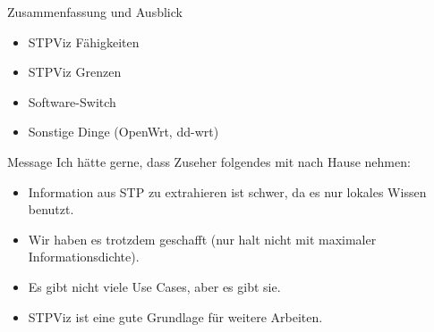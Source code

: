 \documentclass{beamer}
\begin{document}
\begin{frame}{Zusammenfassung und Ausblick}
    \begin{itemize}
        \item STPViz Fähigkeiten
        \item STPViz Grenzen
        \item Software-Switch
        \item Sonstige Dinge (OpenWrt, dd-wrt)
    \end{itemize}
\end{frame}

\begin{frame}{Message}
Ich hätte gerne, dass Zuseher folgendes mit nach Hause nehmen:\\
\begin{itemize}
    \item Information aus STP zu extrahieren ist schwer, da es nur lokales Wissen benutzt.
    \item Wir haben es trotzdem geschafft (nur halt nicht mit maximaler Informationsdichte).
    \item Es gibt nicht viele Use Cases, aber es gibt sie.
    \item STPViz ist eine gute Grundlage für weitere Arbeiten.
\end{itemize}
\end{frame}
\end{document}
